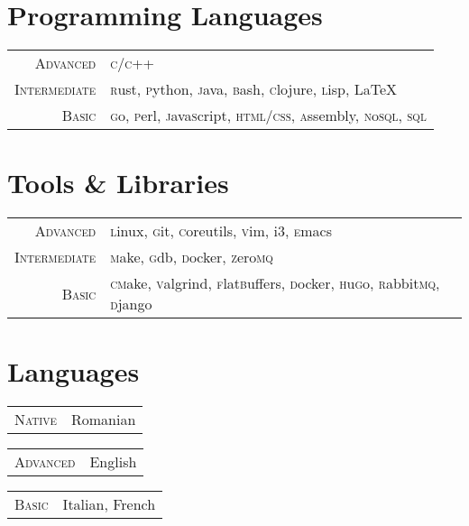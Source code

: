 \documentclass[a4paper,12pt]{article}
\begin{document}
\section{Programming Languages}
\begin{tabular}{rl}
  \textsc{Advanced}&
    \textsc{c/c++}\\
  \textsc{Intermediate}&
    \textsc{r}ust, \textsc{p}ython, \textsc{j}ava, 
    \textsc{b}ash, \textsc{c}lojure, \textsc{l}isp, 
    \LaTeX\\
  \textsc{Basic}&
    \textsc{g}o, \textsc{p}erl, \textsc{j}ava\textsc{s}cript, 
    \textsc{html/css}, \textsc{a}ssembly, 
    \textsc{n}o\textsc{sql}, \textsc{sql}\\
\end{tabular}

\section{Tools \& Libraries}
\begin{tabular}{rl}
  \textsc{Advanced}&
    \textsc{l}inux, \textsc{g}it, \textsc{c}oreutils, \textsc{v}im,  i3, \textsc{e}macs\\
  \textsc{Intermediate}&
     \textsc{m}ake, \textsc{g}db, \textsc{d}ocker, \textsc{z}ero\textsc{mq}\\ 
  \textsc{Basic}&
    \textsc{cm}ake,  \textsc{v}algrind, \textsc{f}lat\textsc{b}uffers, 
    \textsc{d}ocker, \textsc{h}u\textsc{g}o, 
    \textsc{r}abbit\textsc{mq}, \textsc{d}jango \\ 
\end{tabular}

\section{Languages}
\begin{multicols}{3}
  \begin{tabular}{rl}
    \textsc{Native}&Romanian\\
  \end{tabular}
  \columnbreak

  \begin{tabular}{rl}
    \textsc{Advanced}&English\\
  \end{tabular}
  \columnbreak

  \begin{tabular}{rl}
    \textsc{Basic}&Italian, French\\
  \end{tabular}
\end{multicols}
\end{document}
